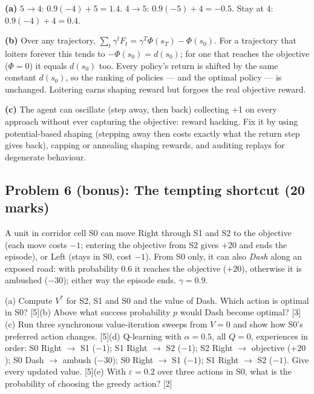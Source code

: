 \documentclass[11pt]{article}
\begin{document}
\begin{soln}\textbf{(a)} $5\to4$: $0.9(-4)+5=\mathbf{1.4}$. $4\to5$: $0.9(-5)+4=\mathbf{-0.5}$. Stay at 4: $0.9(-4)+4=\mathbf{0.4}$.

\textbf{(b)} Over any trajectory, $\sum_t\gamma^tF_t=\gamma^T\Phi(s_T)-\Phi(s_0)$. For a trajectory that loiters forever this tends to $-\Phi(s_0)=d(s_0)$; for one that reaches the objective ($\Phi=0$) it equals $d(s_0)$ too. Every policy's return is shifted by the same constant $d(s_0)$, so the ranking of policies --- and the optimal policy --- is unchanged. Loitering earns shaping reward but forgoes the real objective reward.

\textbf{(c)} The agent can oscillate (step away, then back) collecting +1 on every approach without ever capturing the objective: reward hacking. Fix it by using potential-based shaping (stepping away then costs exactly what the return step gives back), capping or annealing shaping rewards, and auditing replays for degenerate behaviour.\end{soln}

\subsection{Problem 6 (bonus): The tempting shortcut \normalfont\small\color{GreyN}(20 marks)}

\begin{prob}A unit in corridor cell S0 can move Right through S1 and S2 to the objective (each move costs $-1$; entering the objective from S2 gives $+20$ and ends the episode), or Left (stays in S0, cost $-1$). From S0 only, it can also \textit{Dash} along an exposed road: with probability 0.6 it reaches the objective ($+20$), otherwise it is ambushed ($-30$); either way the episode ends. $\gamma=0.9$.

(a) Compute $V^*$ for S2, S1 and S0 and the value of Dash. Which action is optimal in S0? [5]\newline (b) Above what success probability $p$ would Dash become optimal? [3]\newline (c) Run three synchronous value-iteration sweeps from $V=0$ and show how S0's preferred action changes. [5]\newline (d) Q-learning with $\alpha=0.5$, all $Q=0$, experiences in order: S0 Right $\to$ S1 ($-1$); S1 Right $\to$ S2 ($-1$); S2 Right $\to$ objective ($+20$); S0 Dash $\to$ ambush ($-30$); S0 Right $\to$ S1 ($-1$); S1 Right $\to$ S2 ($-1$). Give every updated value. [5]\newline (e) With $\varepsilon=0.2$ over three actions in S0, what is the probability of choosing the greedy action? [2]\end{prob}
\end{document}
